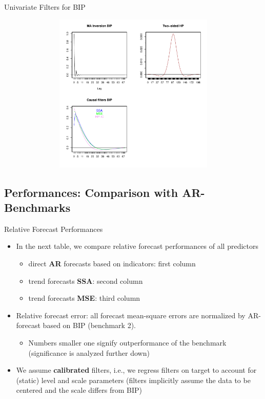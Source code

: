 \documentclass{beamer}
\begin{document}
\begin{frame} {Univariate Filters for BIP}
\begin{figure}[H]\begin{center}\includegraphics[height=3in, width=4.5in]{filt_coef_INDPRO_uni_x.pdf}\caption{\label{data}}\end{center}\end{figure}\end{frame}



\subsection{Performances: Comparison with AR-Benchmarks}


\begin{frame} {Relative Forecast Performances}
\begin{itemize}
\item In the next table, we compare relative forecast performances of all predictors
\begin{itemize}
\item direct \textbf{AR} forecasts based on indicators: first column
\item trend forecasts \textbf{SSA}: second column
\item trend forecasts \textbf{MSE}: third column
\end{itemize}
\item Relative forecast error: all forecast mean-square errors are normalized by AR-forecast based on BIP (benchmark 2). 
\begin{itemize}
\item Numbers smaller one signify outperformance of the benchmark (significance is analyzed further down)
\end{itemize}
\item We assume \textbf{calibrated} filters, i.e., we regress filters on target to account for (static) level and scale parameters (filters implicitly assume the data to be centered and the scale differs from BIP) 
\end{itemize}
\end{frame}
\end{document}
